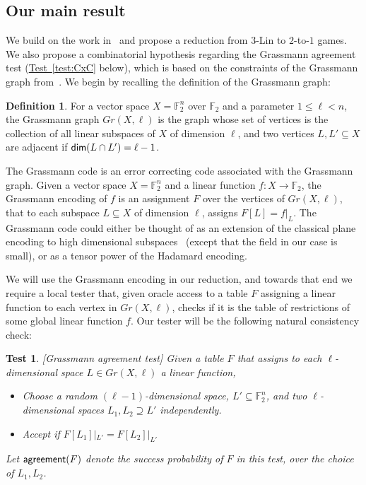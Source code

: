 \documentclass[11pt]{article}
\numberwithin{equation}{section}
\theoremstyle{definition}
\newtheorem{definition}[theorem]{Definition}
\theoremstyle{plain}
\newcommand{\expref}[2]{\hyperref[#2]{#1~\ref{#2}}}
\newtheorem{test}[theorem]{Test}
\renewcommand\leq{\leqslant}
\renewcommand\subset{\subseteq}
\renewcommand\supset{\supseteq}
\def\F{\mathbb{F}}
\def\agr{{\sf agreement}}
\begin{document}
\subsection{Our main result}

We build on the work in~\cite{KMS} and propose a reduction from $3$-Lin
to $2$-to-$1$ games. We also propose a combinatorial hypothesis
regarding the Grassmann
agreement test (\expref{Test}{test:CxC} below), which is based on the
constraints of the Grassmann graph from~\cite{KMS}. We begin by recalling
the definition of the Grassmann graph:
\begin{definition}
For a vector space $X = \mathbb{F}_2^n$
over %
$\mathbb{F}_2$  %
and a parameter $1\leq \ell<n$, the Grassmann
graph $Gr(X,\ell)$ is the graph whose set of vertices is the collection of all linear subspaces
of $X$ of dimension $\ell$, and two vertices $L,L'\subseteq X$ are
%
adjacent  %
if
  ${\sf dim}(L\cap L') = \ell-1$.
\end{definition}

The Grassmann code is an error correcting code associated with the Grassmann graph.
Given a vector space $X = \mathbb{F}_2^n$ and a linear function $f\colon X\to\mathbb{F}_2$,
the Grassmann encoding of $f$ is an assignment $F$ over the vertices of $Gr(X,\ell)$, that
to each subspace $L\subseteq X$ of dimension $\ell$, assigns $F[L] = f|_{L}$.
The Grassmann code could either be thought of as an extension of the classical plane
encoding to high dimensional subspaces~\cite{RaSa}
(except that the field in our case is small), or as a tensor
power
%
of the Hadamard encoding.

We will use the Grassmann encoding in our reduction, and towards that end we require a
local tester that, given oracle access to
a table $F$ assigning a linear function to each vertex in $Gr(X,\ell)$, checks if it is
the table of restrictions of some global
linear function $f$. Our tester will be the following natural consistency check:
%
\begin{test}\label{Grtest}[Grassmann agreement test\label{test:CxC}]  %
Given a table $F$ that assigns to each $\ell$-dimensional space $L\in Gr(X,\ell)$ a
linear function,
\begin{itemize}
  \item Choose a random $(\ell-1)$-dimensional space, $L'\subset \F_2^n$, and two $\ell$-dimensional spaces $L_1,L_2\supset L'$ independently.
  \item Accept if $F[L_1]|_{L'} = F[L_2]|_{L'}$
\end{itemize}
Let $\agr(F)$ denote the success probability of $F$ in this test, over the choice of $L_1,L_2$.
\end{test}
\end{document}
